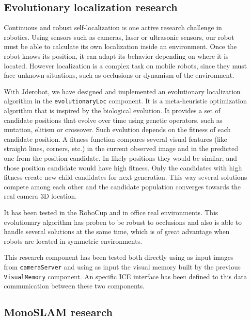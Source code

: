 \documentclass[twocolumn]{svjour3}          %
\begin{document}
\subsection{Evolutionary localization research}

Continuous and robust self-localization is one active research challenge in robotics. Using sensors such as cameras, laser or ultrasonic sensors, our robot must be able to calculate its own localization inside an environment. Once the robot knows its position, it can adapt its behavior depending on where it is located. However localization is a complex task on mobile robots, since they must face unknown situations, such as occlusions or dynamism of the environment. 

With Jderobot, we have designed and implemented an evolutionary localization algorithm \cite{canas2012} in the \texttt{evolutionaryLoc} component. It is a meta-heuristic optimization algorithm that is inspired by the biological evolution. It provides a set of candidate positions that evolve over time using genetic operators, such as mutation, elitism or crossover. Such evolution depends on the fitness of each candidate position. A fitness function compares several visual features (like straight lines, corners, etc.) in the current observed image and in the predicted one from the position candidate. In likely positions they would be similar, and those position candidate would have high fitness. Only the candidates with high fitness create new child candidates for next generation. This way several solutions compete among each other and the candidate population converges towards the real camera 3D location. 

It has been tested in the RoboCup and in office real environments. This evolutionary algorithm has proben to be robust to occlusions and also is able to handle several solutions at the same time, which is of great advantage when robots are located in symmetric environments.  

This research component has been tested both directly using as input images from \texttt{cameraServer} and using as input the visual memory built by the previous \texttt{VisualMemory} component. An specific ICE interface has been defined to this data communication between these two components.

\subsection{MonoSLAM research}
\label{sec:monoslam}
\end{document}
